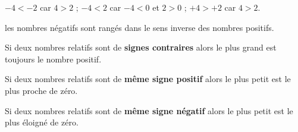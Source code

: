\begin{exemple*1}
   $-4<-2$ car $4>2$ \qquad ; \quad $-4<2$ car $-4<0$ et $2>0$ \qquad ; \quad $+4>+2$ car $4>2$.
\end{exemple*1}

\medskip

\begin{remarque}
   les nombres négatifs sont rangés \og dans le sens inverse \fg{} des nombres positifs.
\end{remarque}

\begin{propriete}
    Si deux nombres relatifs sont de \textbf{signes contraires} alors le plus grand est toujours le nombre positif.
\end{propriete}
\begin{propriete}
    Si deux nombres relatifs sont de \textbf{même signe positif} alors le plus petit est le plus proche de zéro.
\end{propriete}
\begin{propriete}
    Si deux nombres relatifs sont de \textbf{même signe négatif} alors le plus petit est le plus éloigné de zéro.
\end{propriete}

